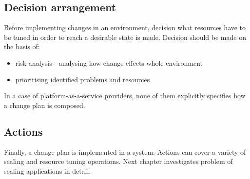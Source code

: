 \subsection{Decision arrangement}
Before implementing changes in an environment, decision what resources have to be tuned in order to reach a desirable state is made. Decision should be made on the basis of:
\begin{itemize}
 \item risk analysis - analysing how change effects whole environment
 \item prioritising identified problems and resources
\end{itemize}

In a case of platform-as-a-service providers, none of them explicitly specifies how a change plan is composed.

\subsection{Actions}
Finally, a change plan is implemented in a system. Actions can cover a variety of scaling and resource tuning operations. Next chapter investigates problem of scaling applications in detail.

